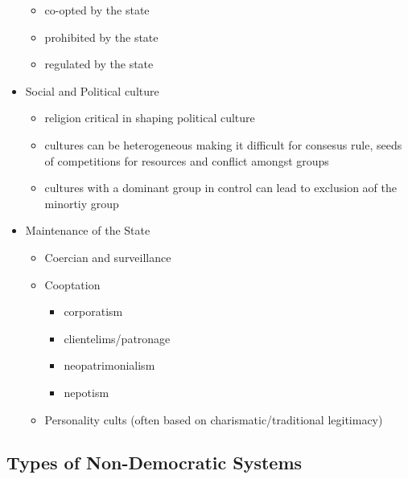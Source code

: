\documentclass[11pt]{article}
\begin{document}
\begin{itemize}
\begin{itemize}
\item co-opted by the state
\item prohibited by the state
\item regulated by the state
\end{itemize}
\item Social and Political culture
\begin{itemize}
\item religion critical in shaping political culture
\item cultures can be heterogeneous making it difficult for consesus rule, seeds of competitions for resources and conflict amongst groups
\item cultures with a dominant group in control can lead to exclusion aof the minortiy group
\end{itemize}
\item Maintenance of the State
\begin{itemize}
\item Coercian and surveillance
\item Cooptation
\begin{itemize}
\item corporatism
\item clientelims/patronage
\item neopatrimonialism
\item nepotism
\end{itemize}
\item Personality cults (often based on charismatic/traditional legitimacy)
\end{itemize}
\end{itemize}
\subsection{Types of Non-Democratic Systems}
\label{sec:orgf28261b}
\end{document}
